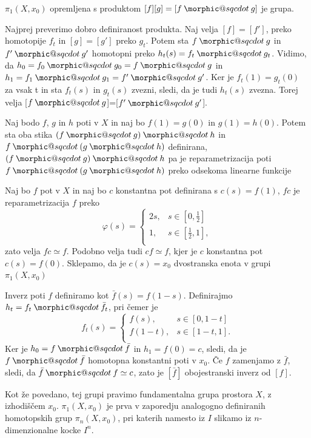 \documentclass[mat1]{fmfdelo}
\makeatletter
\DeclareRobustCommand{\sqcdot}{\mathbin{\mathpalette\morphic@sqcdot\relax}}
\newcommand{\morphic@sqcdot}[2]{%
\sbox\z@{$\m@th#1\centerdot$}%
\ht\z@=.33333\ht\z@
\vcenter{\box\z@}%
}
\makeatother
\begin{document}
    \begin{izrek}
        $\pi_1(X,x_0)$ opremljena s produktom $[f][g] = [f\sqcdot g]$ je grupa.
    \end{izrek}



\begin{dokaz}
    Najprej preverimo dobro definiranost produkta. Naj velja $[f]=[f']$, preko homotopije $f_t$ in $[g]=[g']$ preko $g_t$. Potem sta $f\sqcdot g$ in $f'\sqcdot g'$ homotopni preko
    $h_t(s) =f_t \sqcdot g_t$. Vidimo, da $h_0=f_0 \sqcdot g_0=f \sqcdot g$ in $h_1=f_1 \sqcdot g_1=f'\sqcdot g'$. Ker je $f_t(1)=g_t(0)$ za vsak t in sta $f_t(s)$ in $g_t(s)$ zvezni, sledi, da je tudi $h_t(s)$ zvezna. Torej velja [$f\sqcdot g$]=[$f'\sqcdot g'$].
    
    Naj bodo $f$, $g$ in $h$ poti v $X$ in naj bo $f(1)=g(0)$ in 
    $g(1)=h(0)$. Potem sta oba stika $(f\sqcdot g) \sqcdot h$ in 
    $f\sqcdot (g \sqcdot h)$ definirana, $(f\sqcdot g) \sqcdot h$ pa je
    reparametrizacija poti $f\sqcdot (g \sqcdot h)$ preko odsekoma linearne 
         funkcije


Naj bo $f$ pot v $X$ in naj bo $c$ konstantna pot definirana s $c(s)=f(1)$, $fc$ je reparametrizacija $f$ preko 
$$\varphi(s)=\begin{cases}
2s, &s \in [0,\frac{1}{2}] \\
1, & s \in [\frac{1}{2},1],\\
\end{cases}
$$zato velja $fc\simeq f$. Podobno velja tudi  $cf\simeq f$, kjer je $c$ konstantna pot $c(s)=f(0)$. Sklepamo, da je $c(s)=x_0$ dvostranska enota v grupi  $\pi_1(X,x_0)$
     
Inverz poti $f$ definiramo kot $\bar{f}(s)=f(1-s)$. Definirajmo $h_t=f_t\sqcdot \bar{f_t}$, pri čemer je 
$$
f_t(s)=
\begin{cases}
    f(s), &s \in [0,1-t] \\
    f(1-t), & s \in [1-t,1]. \\
\end{cases}
$$
Ker je $h_0=f\sqcdot \bar{f}$ in $h_1=f(0)=c$, sledi, da je $f\sqcdot \bar{f}$ homotopna konstantni poti v $x_0$. Če $f$ zamenjamo z $\bar{f}$, sledi, da $\bar{f}\sqcdot f\simeq c$, zato je $[\bar{f}]$ obojestranski inverz od $[f]$.
\end{dokaz}


Kot že povedano, tej grupi pravimo fundamentalna grupa prostora $X$, z izhodiščem $x_0$. $\pi_1(X,x_0)$ je prva v zaporedju analogogno definiranih homotopskih grup $\pi_n(X,x_0)$, pri katerih namesto iz $I$ slikamo iz $n$-dimenzionalne kocke $I^n$.
\end{document}
